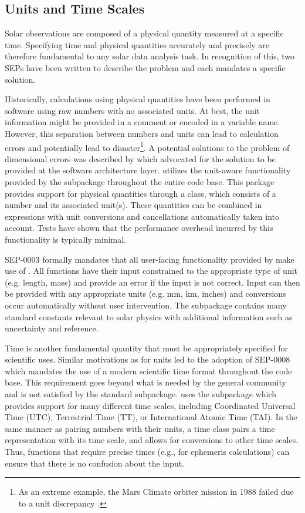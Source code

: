 \subsection{Units and Time Scales}
\label{sec:units}

Solar observations are composed of a physical quantity measured at a specific time.
Specifying time and physical quantities accurately and precisely are therefore fundamental to any solar data analysis task.
In recognition of this, two SEPs have been written to describe the problem and each mandates a specific solution.

Historically, calculations using physical quantities have been performed in software using raw numbers with no associated units.
At best, the unit information might be provided in a comment or encoded in a variable name.
However, this separation between numbers and units can lead to calculation errors and potentially lead to disaster\footnote{As an extreme example, the Mars Climate orbiter mission in 1988 failed due to a unit discrepancy \citep{mco_mishap_report}.}.
A potential solutions to the problem of dimensional errors was described by \citet{Damevski2009} which advocated for the solution to be provided at the software architecture layer.
\sunpypkg utilizes the unit-aware functionality provided by the  subpackage throughout the entire code base.
This package provides support for physical quantities through a  class, which consists of a number and its associated unit(s).
These quantities can be combined in expressions with unit conversions and cancellations automatically taken into account.
Tests have shown that the performance overhead incurred by this functionality is typically minimal.

SEP-0003 \citep{sep-0003} formally mandates that all user-facing functionality provided by \sunpypkg make use of .
All functions have their input constrained to the appropriate type of unit (e.g. length, mass) and provide an error if the input is not correct.
Input can then be provided with any appropriate units (e.g. mm, km, inches) and conversions occur automatically without user intervention.
The  subpackage contains many standard constants relevant to solar physics with additional information such as uncertainty and reference.

Time is another fundamental quantity that must be appropriately specified for scientific uses.
Similar motivations as for units led to the adoption of SEP-0008 \citep{sep-0008} which mandates the use of a modern scientific time format throughout the \sunpypkg code base.
This requirement goes beyond what is needed by the general \python community and is not satisfied by the standard  subpackage.
\sunpypkg uses the  subpackage which provides support for many different time scales, including Coordinated Universal Time (UTC), Terrestrial Time (TT), or International Atomic Time (TAI).
In the same manner as pairing numbers with their units, a time class pairs a time representation with its time scale, and allows for conversions to other time scales.
Thus, functions that require precise times (e.g., for ephemeris calculations) can ensure that there is no confusion about the input.
